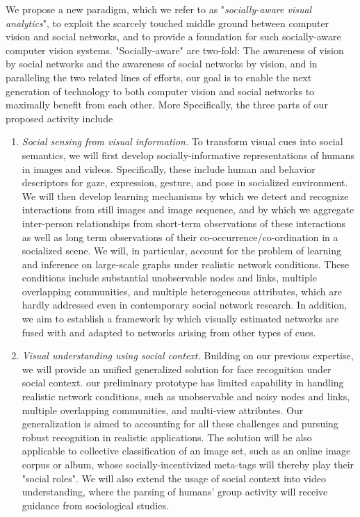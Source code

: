 We propose a new paradigm, which we refer to as "\emph{socially-aware visual analytics}", to exploit the scarcely touched middle ground between computer vision and social networks, and to provide a foundation for such socially-aware computer vision systems. "Socially-aware" are two-fold: The awareness of vision by social networks and the awareness of social networks by vision, and in paralleling the two related lines of efforts, our goal is to enable the next generation of technology to both computer vision and social networks to maximally benefit from each other.  More Specifically, the three parts of our proposed activity include 
\begin{enumerate}
\item \vspace{-0.05in}\emph{Social sensing from visual information.} To transform visual cues into social semantics, we will first develop socially-informative representations of humans in images and videos. Specifically, these include human and behavior descriptors for gaze, expression, gesture, and pose in socialized environment. We will then develop learning mechanisms by which we detect and recognize interactions from still images and image sequence, and by which we aggregate inter-person relationships from short-term observations of these interactions as well as long term observations of their co-occurrence/co-ordination in a socialized scene. We will, in particular, account for the problem of learning and inference on large-scale graphs under realistic network conditions. These conditions include substantial unobservable nodes and links, multiple overlapping communities, and multiple heterogeneous attributes, which are hardly addressed even in contemporary social network research. In addition, we aim to establish a framework by which visually estimated networks are fused with and adapted to networks arising from other types of cues.
\item \vspace{-0.05in}\emph{Visual understanding using social context.} Building on our previous expertise, we will provide an unified generalized solution for face recognition under social context. our preliminary prototype has limited capability in handling realistic network conditions, such as unobservable and noisy nodes and links, multiple overlapping communities, and multi-view attributes. Our generalization is aimed to accounting for all these challenges and pursuing robust recognition in realistic applications. The solution will be also applicable to collective classification of an image set, such as an online image corpus or album, whose socially-incentivized meta-tags will thereby play their "social roles". We will also extend the usage of social context into video understanding, where the parsing of humans' group activity will receive guidance from sociological studies.

\end{enumerate}
